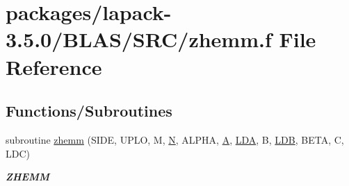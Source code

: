 \hypertarget{lapack-3_85_80_2BLAS_2SRC_2zhemm_8f}{}\section{packages/lapack-\/3.5.0/\+B\+L\+A\+S/\+S\+R\+C/zhemm.f File Reference}
\label{lapack-3_85_80_2BLAS_2SRC_2zhemm_8f}
\subsection*{Functions/\+Subroutines}
\begin{DoxyCompactItemize}
\item 
subroutine \hyperlink{group__complex16__blas__level3_ga6c1fde6c797cc1032c19242662f370f2}{zhemm} (S\+I\+D\+E, U\+P\+L\+O, M, \hyperlink{polmisc_8c_a0240ac851181b84ac374872dc5434ee4}{N}, A\+L\+P\+H\+A, \hyperlink{classA}{A}, \hyperlink{example__user_8c_ae946da542ce0db94dced19b2ecefd1aa}{L\+D\+A}, B, \hyperlink{example__user_8c_a50e90a7104df172b5a89a06c47fcca04}{L\+D\+B}, B\+E\+T\+A, C, L\+D\+C)
\begin{DoxyCompactList}\small\item\em {\bfseries Z\+H\+E\+M\+M} \end{DoxyCompactList}\end{DoxyCompactItemize}
